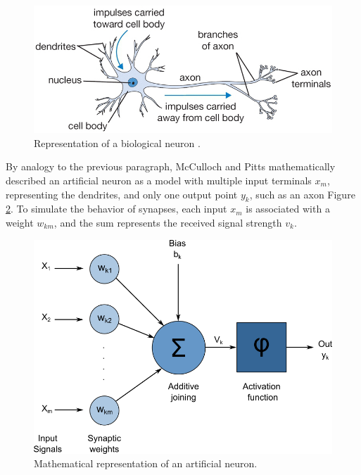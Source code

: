 \begin{figure}
    \centering
    \includegraphics[scale=0.4]{"Part 3 - Learning Systems/Supervised Learning/Deep Learning/images/figure103.png"}
    \caption{Representation of a biological neuron \cite{img:neuronCS}.}
    \label{fig:figure103}
\end{figure}

By analogy to the previous paragraph, McCulloch and Pitts mathematically described an artificial neuron as a model with multiple input terminals $x_m$, representing the dendrites, and only one output point $y_k$, such as an axon Figure \ref{fig:figure104}. To simulate the behavior of synapses, each input $x_m$ is associated with a weight $w_{km}$, and the sum represents the received signal strength $v_k$.

\begin{figure}
    \centering
    \includegraphics[scale=0.7]{"Part 3 - Learning Systems/Supervised Learning/Deep Learning/images/figure104.png"}
    \caption{Mathematical representation of an artificial neuron.}
    \label{fig:figure104}
\end{figure}

